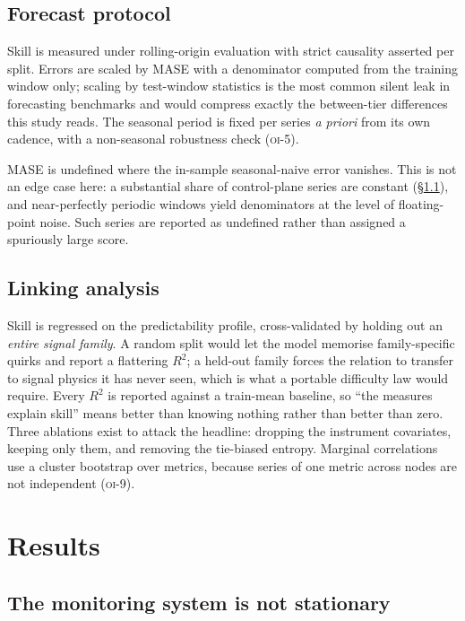 \documentclass[11pt,a4paper]{article}
\newcommand{\oi}[1]{\textsc{oi-#1}}
\begin{document}
\subsection{Forecast protocol}

Skill is measured under rolling-origin evaluation with strict causality
asserted per split. Errors are scaled by MASE with a denominator computed from
the training window only; scaling by test-window statistics is the most common
silent leak in forecasting benchmarks and would compress exactly the
between-tier differences this study reads. The seasonal period is fixed per
series \emph{a priori} from its own cadence, with a non-seasonal robustness
check (\oi{5}).

MASE is undefined where the in-sample seasonal-naive error vanishes. This is
not an edge case here: a substantial share of control-plane series are constant
(\S\ref{sec:census}), and near-perfectly periodic windows yield denominators at
the level of floating-point noise. Such series are reported as undefined rather
than assigned a spuriously large score.

\subsection{Linking analysis}

Skill is regressed on the predictability profile, cross-validated by holding out
an \emph{entire signal family}. A random split would let the model memorise
family-specific quirks and report a flattering \(R^2\); a held-out family forces
the relation to transfer to signal physics it has never seen, which is what a
portable difficulty law would require. Every \(R^2\) is reported against a
train-mean baseline, so ``the measures explain skill'' means better than knowing
nothing rather than better than zero. Three ablations exist to attack the
headline: dropping the instrument covariates, keeping only them, and removing
the tie-biased entropy. Marginal correlations use a cluster bootstrap over
metrics, because series of one metric across nodes are not independent
(\oi{9}).

\section{Results}
\label{sec:results}

\subsection{The monitoring system is not stationary}
\label{sec:census}
\end{document}
